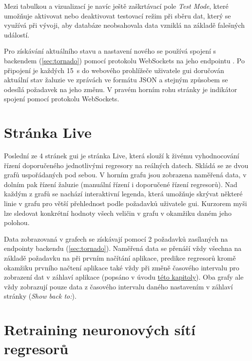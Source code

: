     Mezi tabulkou a vizualizací je navíc ještě zaškrtávací pole \emph{Test Mode}, které umožňuje aktivovat nebo deaktivovat testovací režim při sběru dat, který se využívá při vývoji, aby databáze neobsahovala data vzniklá na základě falešných událostí.

    Pro získávání aktuálního stavu a nastavení nového se používá spojení s backendem (\cref{sec:tornado}) pomocí protokolu WebSockets na jeho endpointu . Po připojení je každých 15~{s} do webového prohlížeče uživatele \acrshort{gui} doručován aktuální stav žaluzie ve zprávách ve formátu JSON a stejným způsobem se odesílá požadavek na jeho změnu. V pravém horním rohu stránky je indikátor spojení pomocí protokolu WebSockets.
\section{Stránka Live} \label{sec:live}
    Poslední ze 4 stránek \acrshort{gui} je stránka Live, která slouží k živému vyhodnocování řízení doporučeného jednotlivými regresory na reálných datech. Skládá se ze dvou grafů uspořádaných pod sebou. V horním grafu jsou zobrazena naměřená data, v dolním pak řízení žaluzie (manuální řízení i doporučené řízení regresorů). Nad každým z grafů se nachází interaktivní legenda, která umožňuje skrývat některé linie v grafu pro větší přehlednost podle požadavků uživatele \acrshort{gui}. Kurzorem myši lze sledovat konkrétní hodnoty všech veličin v grafu v okamžiku daném jeho polohou.

    Data zobrazovaná v grafech se získávají pomocí 2 požadavků zasílaných na endpointy backendu (\cref{sec:tornado}). Naměřená data se přenáší vždy všechna na základě požadavku na  při prvním načítání aplikace, predikce regresorů kromě okamžiku prvního načtení aplikace také vždy při změně časového intervalu pro zobrazení dat v záhlaví aplikace (popsáno v úvodu \hyperref[chap:gui]{této kapitoly}). Oba grafy ale vždy zobrazují pouze data z časového intervalu daného nastavením v záhlaví stránky (\emph{Show back to:}).
\section{Retraining neuronových sítí regresorů}
    \label{sec:retraining}